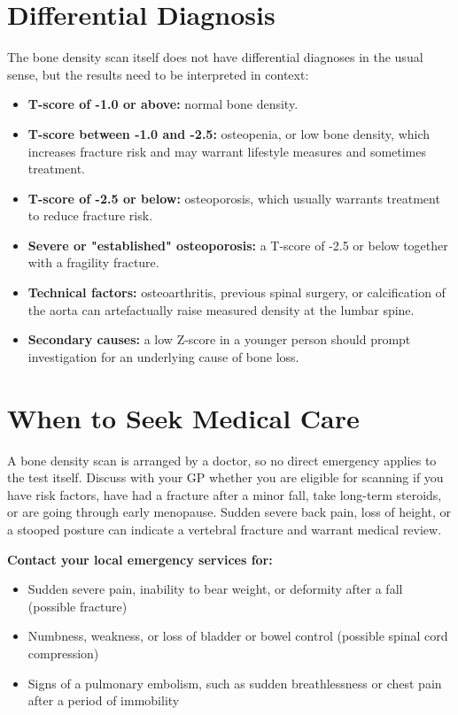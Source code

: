 \section*{Differential Diagnosis}
The bone density scan itself does not have differential diagnoses in the usual sense, but the results need to be interpreted in context:
\begin{itemize}
    \item \textbf{T-score of -1.0 or above:} normal bone density.
    \item \textbf{T-score between -1.0 and -2.5:} osteopenia, or low bone density, which increases fracture risk and may warrant lifestyle measures and sometimes treatment.
    \item \textbf{T-score of -2.5 or below:} osteoporosis, which usually warrants treatment to reduce fracture risk.
    \item \textbf{Severe or "established" osteoporosis:} a T-score of -2.5 or below together with a fragility fracture.
    \item \textbf{Technical factors:} osteoarthritis, previous spinal surgery, or calcification of the aorta can artefactually raise measured density at the lumbar spine.
    \item \textbf{Secondary causes:} a low Z-score in a younger person should prompt investigation for an underlying cause of bone loss.
\end{itemize}

\section*{When to Seek Medical Care}
A bone density scan is arranged by a doctor, so no direct emergency applies to the test itself. Discuss with your GP whether you are eligible for scanning if you have risk factors, have had a fracture after a minor fall, take long-term steroids, or are going through early menopause. Sudden severe back pain, loss of height, or a stooped posture can indicate a vertebral fracture and warrant medical review.

\textbf{Contact your local emergency services for:}
\begin{itemize}
    \item Sudden severe pain, inability to bear weight, or deformity after a fall (possible fracture)
    \item Numbness, weakness, or loss of bladder or bowel control (possible spinal cord compression)
    \item Signs of a pulmonary embolism, such as sudden breathlessness or chest pain after a period of immobility
\end{itemize}

